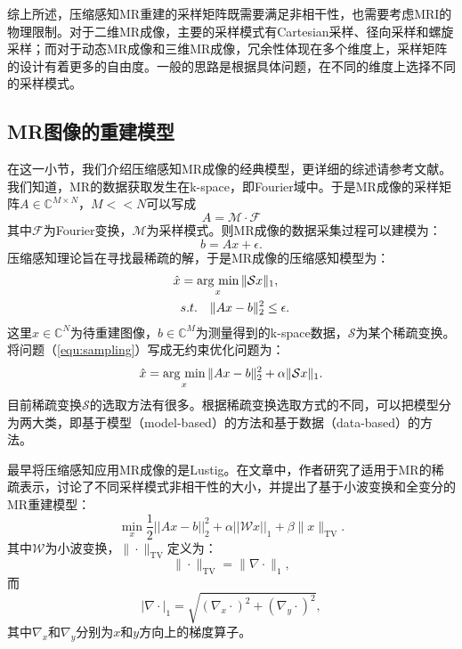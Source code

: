 综上所述，压缩感知MR重建的采样矩阵既需要满足非相干性，也需要考虑MRI的物理限制。对于二维MR成像，主要的采样模式有Cartesian采样、径向采样和螺旋采样；而对于动态MR成像和三维MR成像，冗余性体现在多个维度上，采样矩阵的设计有着更多的自由度。一般的思路是根据具体问题，在不同的维度上选择不同的采样模式。

\subsection{MR图像的重建模型}
\label{sec:models}
在这一小节，我们介绍压缩感知MR成像的经典模型，更详细的综述请参考文献\cite{ravishankar2019image,ye2019compressed}。我们知道，MR的数据获取发生在k-space，即Fourier域中。于是MR成像的采样矩阵$A\in \mathbb{C}^{M\times N}$，$M<<N$可以写成
\begin{equation}
	A=\mathcal{M\cdot F}
\end{equation}
其中$\mathcal{F}$为Fourier变换，$\mathcal{M}$为采样模式。则MR成像的数据采集过程可以建模为：
\begin{equation}
	b=Ax+\epsilon.
\end{equation}
压缩感知理论旨在寻找最稀疏的解，于是MR成像的压缩感知模型为：
\begin{equation}
\begin{aligned}
	\hat{x}&=\argmin_x \|\mathcal{S}x\|_1,\\
	&s.t.\quad \|Ax-b\|_2^2 \leq \epsilon.
	\label{equ:sampling}
\end{aligned}
\end{equation}
这里$x\in \mathbb{C}^N$为待重建图像，$b\in\mathbb{C}^M$为测量得到的k-space数据，$\mathcal{S}$为某个稀疏变换。将问题（\ref{equ:sampling}）写成无约束优化问题为：
\begin{equation}
	\hat{x}=\argmin_x \|Ax-b\|^2_2+\alpha\|\mathcal{S}x\|_1.
\end{equation}
目前稀疏变换$\mathcal{S}$的选取方法有很多。根据稀疏变换选取方式的不同，可以把模型分为两大类，即基于模型（model-based）的方法和基于数据（data-based）的方法。

最早将压缩感知应用MR成像的是Lustig\cite{lustig2006}。在文章中，作者研究了适用于MR的稀疏表示，讨论了不同采样模式非相干性的大小，并提出了基于小波变换和全变分的MR重建模型：
\begin{equation}
	\min_x\frac{1}{2}||Ax-b||^2_2+\alpha ||\mathcal{W}x||_1+\beta \|x\|_\mathrm{TV}.
	\label{equ:wandtv}
\end{equation}
其中$\mathcal{W}$为小波变换，$\|\cdot\|_\mathrm{TV}$定义为：
$$\|\cdot\|_\mathrm{TV} = \|\nabla\cdot\|_1,$$
而
$$|\nabla\cdot|_1=\sqrt{(\nabla_x \cdot)^2+(\nabla_y \cdot)^2},$$
其中$\nabla_x$和$\nabla_y$分别为$x$和$y$方向上的梯度算子。

